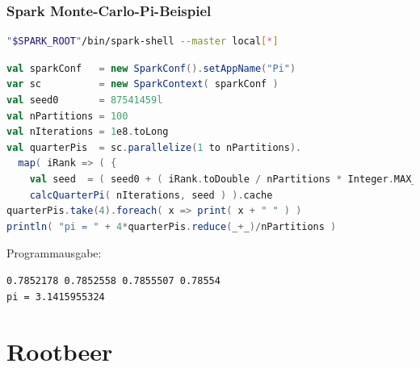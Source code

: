 \begin{frame}[fragile]
    \frametitle{Spark Monte-Carlo-Pi-Beispiel}
    \begin{lstlisting}[language=bash]
"$SPARK_ROOT"/bin/spark-shell --master local[*]
\end{lstlisting}\vspace{-1.5\baselineskip}
    \begin{lstlisting}[language=scala]
val sparkConf   = new SparkConf().setAppName("Pi")
var sc          = new SparkContext( sparkConf )
val seed0       = 87541459l
val nPartitions = 100
val nIterations = 1e8.toLong
val quarterPis  = sc.parallelize(1 to nPartitions).
  map( iRank => ( {
    val seed  = ( seed0 + ( iRank.toDouble / nPartitions * Integer.MAX_VALUE ).toLong ) % Integer.MAX_VALUE
    calcQuarterPi( nIterations, seed ) ).cache
quarterPis.take(4).foreach( x => print( x + " " ) )
println( "pi = " + 4*quarterPis.reduce(_+_)/nPartitions )
\end{lstlisting}\vspace{-1.5\baselineskip}
    Programmausgabe:
    \begin{lstlisting}
0.7852178 0.7852558 0.7855507 0.78554
pi = 3.1415955324
\end{lstlisting}\vspace{-1.5\baselineskip}
\end{frame}



\section{Rootbeer}


